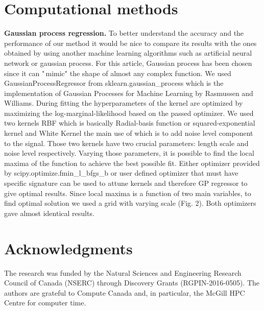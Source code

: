 \documentclass[aps,prl,reprint,amsmath,amssymb,nature]{revtex4-1}
\begin{document}
\section{Computational methods}

\textbf{Gaussian process regression. }To better understand the 
accuracy and the performance of our method it would be nice to compare 
its results with the ones obtained by using another machine learning 
algorithms such as artificial neural network or gaussian process. For 
this article, Gaussian process has been chosen since it can "\,mimic" 
the shape of almost any complex function. We used 
GaussianProcessRegressor from sklearn.gaussian\_process which is the 
implementation of Gaussian Processes for Machine Learning by Rasmussen 
and Williams. During fitting the hyperparameters of the kernel are 
optimized by maximizing the log-marginal-likelihood based on the passed 
optimizer. We used two kernels RBF which is basically Radial-basis 
function or squared-exponential kernel and White Kernel the main use of 
which is to add noise level component to the signal. Those two kernels 
have two crucial parameters: length scale and noise level respectively. 
Varying those parameters, it is possible to find the local maxima of the 
function to achieve the best possible fit. Either optimizer provided by 
scipy.optimize.fmin\_l\_bfgs\_b or user defined optimizer that must have 
specific signature can be used to attune kernels and therefore GP 
regressor to give optimal results. Since local maxima is a function of 
two main variables, to find optimal solution we used a grid with varying 
scale (Fig. 2). Both optimizers gave almost identical results. 

\section{Acknowledgments} 

The research was funded by the Natural Sciences and Engineering Research Council of Canada (NSERC) through Discovery
Grants (RGPIN-2016-0505). The authors are grateful to Compute Canada and, in particular, the McGill HPC Centre for computer time.




\newpage
\clearpage
\setcounter{figure}{0}
\setcounter{page}{1}
\renewcommand{\thefigure}{S\arabic{figure}}
\end{document}
